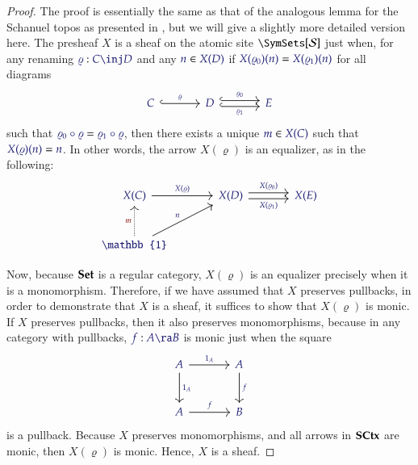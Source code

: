 \documentclass[11pt]{article}
\theoremstyle{definition}
\theoremstyle{remark}
\numberwithin{equation}{section}
\newcommand\SCtxSite{\SymSets[\Sorts]}
\begin{document}
\begin{proof}

  The proof is essentially the same as that of the analogous lemma for the
  Schanuel topos as presented in \cite[A.2.1.11.h]{johnstone:2002}, but we will
  give a slightly more detailed version here. The presheaf $X$ is a sheaf on the
  atomic site $\SCtxSite$ just when, for any renaming
  $\Of{\varrho}{C\inj D}$ and any $\Member{n}{X(D)}$ if
  $\IsEq{X(\varrho_0)(n)}{X(\varrho_1)(n)}$ for all diagrams
  \[
    \begin{tikzcd}[sep=large]
      \IMode{C} \arrow[r, hook, "\IMode{\varrho}"] &
      \IMode{D}
        \arrow[r, hook, shift left, "\IMode{\varrho_0}"]
        \arrow[r, hook, swap, shift right, "\IMode{\varrho_1}"]
      &
      \IMode{E}
    \end{tikzcd}
  \]
  such that $\IsEq{\varrho_0\circ\varrho}{\varrho_1\circ\varrho}$, then there
  exists a unique $\Member{m}{X(C)}$ such that $\IsEq{X(\varrho)(n)}{n}$. In other
  words, the arrow $X(\varrho)$ is an equalizer, as in the following:
  \[
    \begin{tikzcd}[sep=large]
      \IMode{X(C)} \arrow[r, "\IMode{X(\varrho)}"] &
      \IMode{X(D)}
        \arrow[r, shift left, "\IMode{X(\varrho_0)}"]
        \arrow[r, swap, shift right, "\IMode{X(\varrho_1)}"]&
      \IMode{X(E)}
      \\
      \IMode{\mathbb{1}}
        \arrow[u, densely dotted, "\OMode{m}"]
        \arrow[ur, "\IMode{n}"]
    \end{tikzcd}
  \]

  Now, because $\mathbf{Set}$ is a regular category, $X(\varrho)$ is an equalizer
  precisely when it is a monomorphism. Therefore, if we have assumed that $X$
  preserves pullbacks, in order to demonstrate that $X$ is a sheaf, it suffices
  to show that $X(\varrho)$ is monic. If $X$ preserves pullbacks, then it also
  preserves monomorphisms, because in any category with pullbacks, $\Of{f}{A\ra
  B}$ is monic just when the square
  \[
    \begin{tikzcd}[sep=large]
      \IMode{A}
        \arrow[r, "\IMode{\ArrId{A}}"]
        \arrow[d, "\IMode{\ArrId{A}}"] &
      \IMode{A} \arrow[d, "\IMode{f}"]\\
      \IMode{A} \arrow[r, "\IMode{f}"] &
      \IMode{B}
    \end{tikzcd}
  \]
  is a pullback. Because $X$ preserves monomorphisms, and all arrows in $\mathbf{SCtx}$
  are monic, then $X(\varrho)$ is monic. Hence, $X$ is a sheaf.


\end{proof}
\end{document}
